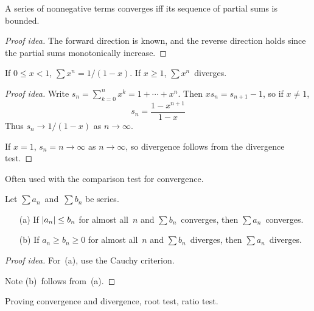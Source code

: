 \begin{thm}
A series of nonnegative terms converges iff its sequence of partial sums is bounded.
\end{thm}
\begin{proof}[Proof idea]
The forward direction is known, and the reverse direction holds since the partial sums monotonically increase.
\end{proof}

\begin{thm}
If \(0\le x<1\), \(\sum x^n=1/(1-x)\). If \(x\ge1\), \(\sum x^n\)~diverges.
\end{thm}
\begin{proof}[Proof idea]
Write \(s_n=\sum_{k=0}^n x^k=1+\cdots+x^n\). Then \(xs_n=s_{n+1}-1\), so if \(x\ne 1\),
\[s_n=\frac{1-x^{n+1}}{1-x}\]
Thus \(s_n\to 1/(1-x)\) as \(n\to\infty\).

If \(x=1\), \(s_n=n\to\infty\) as \(n\to\infty\), so divergence follows from the divergence test.
\end{proof}
\begin{app}
Often used with the comparison test for convergence.
\end{app}

\begin{thm}
Let \(\sum a_n\)~and~\(\sum b_n\) be series.
\begin{enumerate}[itemsep=0pt]
\item[(a)] If \(|{a_n}|\le b_n\) for almost all~\(n\) and \(\sum b_n\)~converges, then \(\sum a_n\)~converges.
\item[(b)] If \(a_n\ge b_n\ge 0\) for almost all~\(n\) and \(\sum b_n\)~diverges, then \(\sum a_n\)~diverges.
\end{enumerate}
\end{thm}
\begin{proof}[Proof idea]
For~(a), use the Cauchy criterion.

Note (b)~follows from~(a).
\end{proof}
\begin{app}
Proving convergence and divergence, root test, ratio test.
\end{app}

